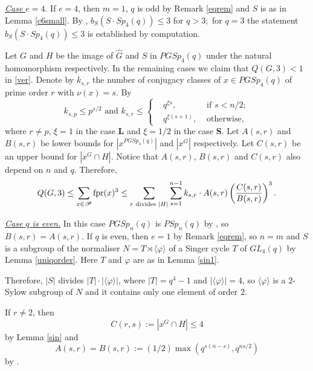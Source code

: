 \medskip

\underline{\it Case {$e=4.$}} If $e=4$, then $m=1$, $q$ is odd by Remark \ref{eqrem} and $S$ is as in Lemma \ref{c6small}. By \cite[Table 2]{burness}, $b_S(S \cdot Sp_4(q)) \le 3$  for $q>3;$ for $q=3$ the statement  $b_S(S \cdot Sp_4(q)) \le 3$ is established by computation.


\medskip


 Let $G$ and $H$ be the image of $\hat{G}$ and $S$ in $PGSp_4(q)$ under the natural homomorphism respectively. In the remaining cases 
 we claim  that $Q(G,3)<1$ in \eqref{ver}.  
Denote by $k_{s,r}$ the number of conjugacy classes of  $x \in PGSp_4(q)$ of prime order $r$  with $\nu(x)=s$. By \cite[Propositions 3.24 and 3.40]{fpr2}
\begin{equation}\label{40s}
k_{s,p} \le p^{s/2} \text{ and }
k_{s,r}  \le 
\left\{ 
\begin{aligned}
&q^{\xi s}, &\text{ if } s<n/2;\\
&q^{\xi(s+1)}, &\text{ otherwise},
\end{aligned}
\right.
\end{equation}
where $r \ne p$, $\xi=1$ in the case {\bf L} and $\xi=1/2$ in the case {\bf S}. Let $A(s,r)$ and $B(s,r)$ be  lower bounds for $|x^{PGSp_4(q)}|$ and $|x^G|$ respectively. Let $C(s,r)$ be an upper bound for $|x^G \cap H|.$   Notice that $A(s,r)$, $B(s,r)$ and $C(s,r)$ also depend on $n$ and $q$. Therefore, 
\begin{equation}\label{QABC}
Q(G,3) \le \sum_{{x} \in \mathscr{P}}{\mathrm{fpr}}({x})^3 \le \sum_{r \text{ divides } |H|}
\sum_{s=1}^{n-1} k_{s,r} \cdot A(s,r) \left(\frac{C(s,r)}{B(s,r)}  \right)^3. 
\end{equation}

\medskip

\underline{\it Case {$q$} is even.} In this case $PGSp_n(q)$ is $PSp_n(q)$ by \cite[Proposition 2.4.4]{kleidlieb}, so $B(s,r)=A(s,r).$  If $q$ is even, then $e=1$ by Remark \ref{eqrem}, so $n=m$ and $S$ is a subgroup of the normaliser $N=T \rtimes \langle \varphi \rangle$ of a Singer cycle $T$ of $GL_4(q)$ by Lemma \ref{uniqorder}. Here $T$ and $\varphi$ are as in Lemma \ref{sin1}. 


 Therefore, $|S|$ divides $|T|\cdot|\langle \varphi \rangle|$, where $|T|=q^4-1$ and $|\langle \varphi \rangle|=4$, so $\langle \varphi \rangle$ is a $2$-Sylow subgroup of $N$ and it contains only one element of order $2$. 

 If $r \ne 2$, then
\begin{equation} \label{41s}
 C(r,s):= |x^G \cap H|\le 4
\end{equation}
 by  Lemma \ref{sin} and 
\begin{equation}\label{42s}
A(s,r)=B(s,r):=
(1/2) \max(q^{s(n-s)},q^{ns/2})
\end{equation}
by  \cite[Lemma 3.34 and Proposition 3.36]{fpr2}.

